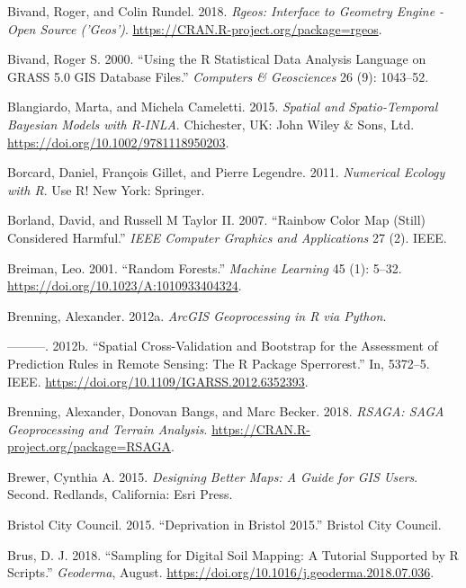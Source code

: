 \documentclass[]{krantz}
\begin{document}
\leavevmode\hypertarget{ref-R-rgeos}{}%
Bivand, Roger, and Colin Rundel. 2018. \emph{Rgeos: Interface to Geometry Engine - Open Source ('Geos')}. \url{https://CRAN.R-project.org/package=rgeos}.

\leavevmode\hypertarget{ref-bivand_using_2000}{}%
Bivand, Roger S. 2000. ``Using the R Statistical Data Analysis Language on GRASS 5.0 GIS Database Files.'' \emph{Computers \& Geosciences} 26 (9): 1043--52.

\leavevmode\hypertarget{ref-blangiardo_spatial_2015}{}%
Blangiardo, Marta, and Michela Cameletti. 2015. \emph{Spatial and Spatio-Temporal Bayesian Models with R-INLA}. Chichester, UK: John Wiley \& Sons, Ltd. \url{https://doi.org/10.1002/9781118950203}.

\leavevmode\hypertarget{ref-borcard_numerical_2011}{}%
Borcard, Daniel, François Gillet, and Pierre Legendre. 2011. \emph{Numerical Ecology with R}. Use R! New York: Springer.

\leavevmode\hypertarget{ref-borland_rainbow_2007}{}%
Borland, David, and Russell M Taylor II. 2007. ``Rainbow Color Map (Still) Considered Harmful.'' \emph{IEEE Computer Graphics and Applications} 27 (2). IEEE.

\leavevmode\hypertarget{ref-breiman_random_2001}{}%
Breiman, Leo. 2001. ``Random Forests.'' \emph{Machine Learning} 45 (1): 5--32. \url{https://doi.org/10.1023/A:1010933404324}.

\leavevmode\hypertarget{ref-brenning_arcgis_2012}{}%
Brenning, Alexander. 2012a. \emph{ArcGIS Geoprocessing in R via Python}.

\leavevmode\hypertarget{ref-brenning_spatial_2012}{}%
---------. 2012b. ``Spatial Cross-Validation and Bootstrap for the Assessment of Prediction Rules in Remote Sensing: The R Package Sperrorest.'' In, 5372--5. IEEE. \url{https://doi.org/10.1109/IGARSS.2012.6352393}.

\leavevmode\hypertarget{ref-R-RSAGA}{}%
Brenning, Alexander, Donovan Bangs, and Marc Becker. 2018. \emph{RSAGA: SAGA Geoprocessing and Terrain Analysis}. \url{https://CRAN.R-project.org/package=RSAGA}.

\leavevmode\hypertarget{ref-brewer_designing_2015}{}%
Brewer, Cynthia A. 2015. \emph{Designing Better Maps: A Guide for GIS Users}. Second. Redlands, California: Esri Press.

\leavevmode\hypertarget{ref-bristol_city_council_deprivation_2015}{}%
Bristol City Council. 2015. ``Deprivation in Bristol 2015.'' Bristol City Council.

\leavevmode\hypertarget{ref-brus_sampling_2018}{}%
Brus, D. J. 2018. ``Sampling for Digital Soil Mapping: A Tutorial Supported by R Scripts.'' \emph{Geoderma}, August. \url{https://doi.org/10.1016/j.geoderma.2018.07.036}.
\end{document}
